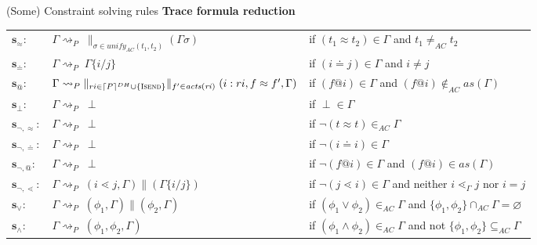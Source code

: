 \documentclass[11pt,aspectratio=169]{beamer}
\begin{document}
\begin{frame}[fragile]{(Some) Constraint solving rules}
    \textbf{Trace formula reduction}
    \begin{table}
        \raggedright
        \footnotesize
        \begin{tabular}{lll}
            $\mathbf{s_{\approx}:}$
                & $\Gamma \rightsquigarrow_P\;\parallel_{\sigma \in \mathit{unify}_{AC}(t_1, t_2)}(\Gamma\sigma)$
                & if $(t_1 \approx t_2) \in \Gamma$ and $t_1 \neq_{AC} t_2$\\
            $\mathbf{s_{\doteq}:}$
                & $\Gamma \rightsquigarrow_P\;\Gamma\{i/j\}$
                & if $(i \doteq j) \in \Gamma$ and $i \neq j$\\
            $\mathbf{s_{@}:}$
                & $\Gamma \rightsquigarrow_P\;\parallel_{ri \in \lceil P \rceil^{DH}\cup\{\textsc{Isend}\}} \parallel_{f' \in \mathit{acts(ri)}}(i:ri, f \approx f', \Gamma)$
                & if $(f@i) \in \Gamma$ and $(f@i) \notin_{AC} as(\Gamma)$\\
            $\mathbf{s_{\perp}:}$
                & $\Gamma \rightsquigarrow_P\; \perp$
                & if $\perp \in \Gamma$\\
            $\mathbf{s_{\neg,\approx}:}$
                & $\Gamma \rightsquigarrow_P\; \perp$
                & if $\neg (t \approx t) \in_{AC} \Gamma$\\
            $\mathbf{s_{\neg,\doteq}:}$
                & $\Gamma \rightsquigarrow_P\; \perp$
                & if $\neg(i \doteq i) \in \Gamma$\\
            $\mathbf{s_{\neg,@}:}$
                & $\Gamma \rightsquigarrow_P\; \perp$
                & if $\neg(f@i) \in \Gamma$ and $(f@i) \in as(\Gamma)$\\
            $\mathbf{s_{\neg,\lessdot}:}$
                & $\Gamma \rightsquigarrow_P\; (i \lessdot j, \Gamma) \parallel (\Gamma\{i/j\})$
                & if $\neg(j \lessdot i) \in \Gamma$ and neither $i \lessdot_{\Gamma} j$ nor $i = j$\\
            $\mathbf{s_{\vee}:}$
                & $\Gamma \rightsquigarrow_P\; (\phi_1, \Gamma) \parallel (\phi_2, \Gamma)$
                & if $(\phi_1 \vee \phi_2) \in_{AC} \Gamma$ and $\{\phi_1, \phi_2\} \cap_{AC} \Gamma = \varnothing $\\
            $\mathbf{s_{\wedge}:}$
                & $\Gamma \rightsquigarrow_P\; (\phi_1, \phi_2, \Gamma)$
                & if $(\phi_1 \wedge \phi_2) \in_{AC} \Gamma$ and not $\{\phi_1, \phi_2\} \subseteq_{AC} \Gamma$
        \end{tabular}
    \end{table}
\end{frame}
\end{document}

